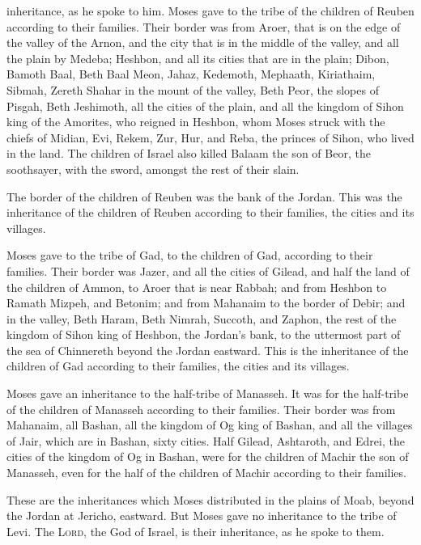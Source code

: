 inheritance, as he spoke to him.  Moses gave to the tribe
of the children of Reuben according to their families. 
Their border was from Aroer, that is on the edge of the valley of the
Arnon, and the city that is in the middle of the valley, and all the
plain by Medeba;  Heshbon, and all its cities that are in
the plain; Dibon, Bamoth Baal, Beth Baal Meon,  Jahaz,
Kedemoth, Mephaath,  Kiriathaim, Sibmah, Zereth Shahar in
the mount of the valley,  Beth Peor, the slopes of
Pisgah, Beth Jeshimoth,  all the cities of the plain, and
all the kingdom of Sihon king of the Amorites, who reigned in Heshbon,
whom Moses struck with the chiefs of Midian, Evi, Rekem, Zur, Hur, and
Reba, the princes of Sihon, who lived in the land.  The
children of Israel also killed Balaam the son of Beor, the soothsayer,
with the sword, amongst the rest of their slain.

 The border of the children of Reuben was the bank of the
Jordan. This was the inheritance of the children of Reuben according to
their families, the cities and its villages.

 Moses gave to the tribe of Gad, to the children of Gad,
according to their families.  Their border was Jazer, and
all the cities of Gilead, and half the land of the children of Ammon, to
Aroer that is near Rabbah;  and from Heshbon to Ramath
Mizpeh, and Betonim; and from Mahanaim to the border of Debir;
 and in the valley, Beth Haram, Beth Nimrah, Succoth, and
Zaphon, the rest of the kingdom of Sihon king of Heshbon, the Jordan's
bank, to the uttermost part of the sea of Chinnereth beyond the Jordan
eastward.  This is the inheritance of the children of Gad
according to their families, the cities and its villages.

 Moses gave an inheritance to the half-tribe of Manasseh.
It was for the half-tribe of the children of Manasseh according to their
families.  Their border was from Mahanaim, all Bashan,
all the kingdom of Og king of Bashan, and all the villages of Jair,
which are in Bashan, sixty cities.  Half Gilead,
Ashtaroth, and Edrei, the cities of the kingdom of Og in Bashan, were
for the children of Machir the son of Manasseh, even for the half of the
children of Machir according to their families.

 These are the inheritances which Moses distributed in
the plains of Moab, beyond the Jordan at Jericho, eastward.
 But Moses gave no inheritance to the tribe of Levi. The
\textsc{Lord}, the God of Israel, is their inheritance, as he spoke to
them.

